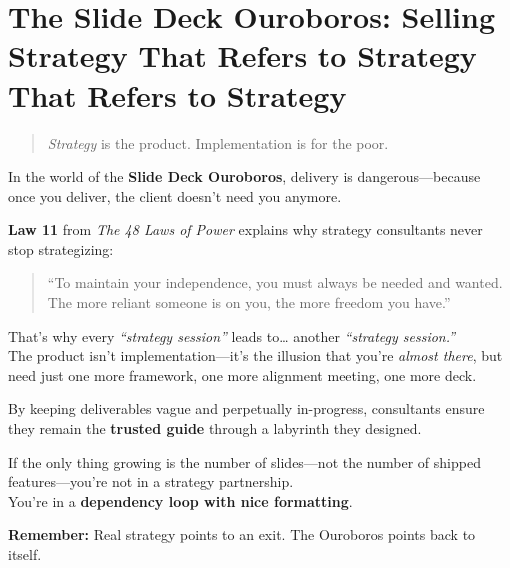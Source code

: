 \section{The Slide Deck Ouroboros: Selling Strategy That Refers to Strategy That Refers to Strategy}

\begin{quote}
\textit{Strategy} is the product. Implementation is for the poor.
\end{quote}

  In the world of the \textbf{Slide Deck Ouroboros}, delivery is dangerous—because once you deliver, the client doesn’t need you anymore.
  
  \medskip
  
  \textbf{Law 11} from \textit{The 48 Laws of Power} explains why strategy consultants never stop strategizing:
  \begin{quote}
  ``To maintain your independence, you must always be needed and wanted. The more reliant someone is on you, the more freedom you have.''
  \end{quote}
  
  \medskip
  
  That’s why every \textit{``strategy session''} leads to… another \textit{``strategy session.''} \\
  The product isn’t implementation—it’s the illusion that you’re \textit{almost there}, but need just one more framework, one more alignment meeting, one more deck.
  
  \medskip
  
  By keeping deliverables vague and perpetually in-progress, consultants ensure they remain the \textbf{trusted guide} through a labyrinth they designed.
  
  \medskip
  
  If the only thing growing is the number of slides—not the number of shipped features—you’re not in a strategy partnership. \\
  You’re in a \textbf{dependency loop with nice formatting}.
  
  \medskip
  
  \textbf{Remember:} Real strategy points to an exit. The Ouroboros points back to itself.
  



